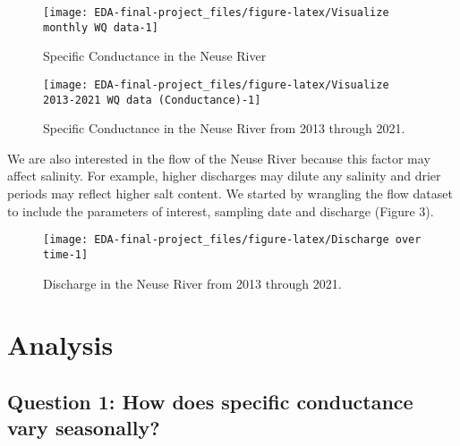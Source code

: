 \documentclass[
  12pt,
]{article}
\begin{document}
\begin{figure}

\texttt{[image: EDA-final-project\_files/figure-latex/Visualize monthly WQ data-1]} \hfill{}

\caption{Specific Conductance in the Neuse River}\label{fig:Visualize monthly WQ data}
\end{figure}

\begin{figure}

\texttt{[image: EDA-final-project\_files/figure-latex/Visualize 2013-2021 WQ data (Conductance)-1]} \hfill{}

\caption{Specific Conductance in the Neuse River from 2013 through 2021.}\label{fig:Visualize 2013-2021 WQ data (Conductance)}
\end{figure}

\newpage

We are also interested in the flow of the Neuse River because this
factor may affect salinity. For example, higher discharges may dilute
any salinity and drier periods may reflect higher salt content. We
started by wrangling the flow dataset to include the parameters of
interest, sampling date and discharge (Figure 3).

\begin{figure}

\texttt{[image: EDA-final-project\_files/figure-latex/Discharge over time-1]} \hfill{}

\caption{Discharge in the Neuse River from 2013 through 2021.}\label{fig:Discharge over time}
\end{figure}

\newpage

\hypertarget{analysis}{%
\section{Analysis}\label{analysis}}

\hypertarget{question-1-how-does-specific-conductance-vary-seasonally}{%
\subsection{Question 1: How does specific conductance vary
seasonally?}\label{question-1-how-does-specific-conductance-vary-seasonally}}
\end{document}
